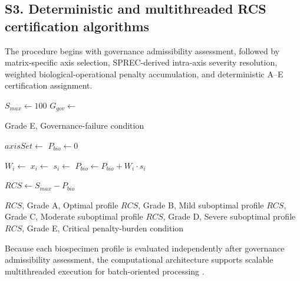 \documentclass[preprint,12pt]{elsarticle}
\begin{document}
\subsection*{S3. Deterministic and multithreaded RCS certification algorithms}

The procedure begins with governance admissibility assessment, followed by matrix-specific axis selection, SPREC-derived intra-axis severity resolution, weighted biological-operational penalty accumulation, and deterministic A--E certification assignment.

\begin{algorithm}[!htbp]
\caption{Governance-aware Ribeiro Classification Score certification algorithm}
\label{alg:rcs_certification}
\footnotesize
\begin{algorithmic}[1]

\State $S_{max} \gets 100$
\State $G_{gov} \gets$ 

    \State \Return Grade E, Governance-failure condition
\EndIf

\State $axisSet \gets$ 
\State $P_{bio} \gets 0$

    \State $W_i \gets$ 
    \State $x_i \gets$ 
    \State $s_i \gets$ 
    \State $P_{bio} \gets P_{bio} + W_i \cdot s_i$
\EndFor

\State $RCS \gets S_{max} - P_{bio}$

    \State \Return $RCS$, Grade A, Optimal profile
    \State \Return $RCS$, Grade B, Mild suboptimal profile
    \State \Return $RCS$, Grade C, Moderate suboptimal profile
    \State \Return $RCS$, Grade D, Severe suboptimal profile
\Else
    \State \Return $RCS$, Grade E, Critical penalty-burden condition
\EndIf

\EndProcedure
\end{algorithmic}
\normalsize
\end{algorithm}

Because each biospecimen profile is evaluated independently after governance admissibility assessment, the computational architecture supports scalable multithreaded execution for batch-oriented processing \cite{dean2008mapreduce,openmp2026}.
\end{document}
